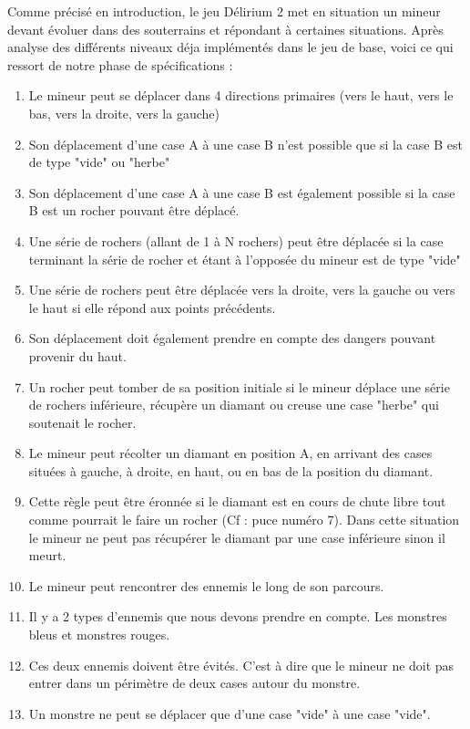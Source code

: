 \documentclass[a4paper,11pt]{article}
\begin{document}
Comme précisé en introduction, le jeu Délirium 2 met en situation un mineur devant évoluer dans des souterrains et répondant à certaines situations. Après analyse des différents niveaux déja implémentés dans le jeu de base, voici ce qui ressort de notre phase de spécifications :\\
		
		\begin{enumerate}
			\item Le mineur peut se déplacer dans 4 directions primaires (vers le haut, vers le bas, vers la droite, vers la gauche)
			\item Son déplacement d'une case A à une case B n'est possible que si la case B est de type "vide" ou "herbe"
			\item Son déplacement d'une case A à une case B est également possible si la case B est un rocher pouvant être déplacé.
			\item Une série de rochers (allant de 1 à N rochers) peut être déplacée si la case terminant la série de rocher et étant à l'opposée du mineur est de type "vide"
			\item Une série de rochers peut être déplacée vers la droite, vers la gauche ou vers le haut si elle répond aux points précédents.
			\item Son déplacement doit également prendre en compte des dangers pouvant provenir du haut.
			\item Un rocher peut tomber de sa position initiale si le mineur déplace une série de rochers inférieure, récupère un diamant ou creuse une case "herbe" qui soutenait le rocher.
			\item Le mineur peut récolter un diamant en position A, en arrivant des cases situées à gauche, à droite, en haut, ou en bas de la position du diamant.
			\item Cette règle peut être éronnée si le diamant est en cours de chute libre tout comme pourrait le faire un rocher (Cf : puce numéro 7). Dans cette situation le mineur ne peut pas récupérer le diamant par une case inférieure sinon il meurt.
			\item Le mineur peut rencontrer des ennemis le long de son parcours.
			\item Il y a 2 types d'ennemis que nous devons prendre en compte. Les monstres bleus et monstres rouges.
			\item Ces deux ennemis doivent être évités. C'est à dire que le mineur ne doit pas entrer dans un périmètre de deux cases autour du monstre.
			\item Un monstre ne peut se déplacer que d'une case "vide" à une case "vide".

\end{enumerate}
\end{document}
